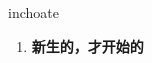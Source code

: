
\begin{frame}
{\huge inchoate}
\begin{center}
\begin{enumerate}\Large
  \item \textbf{新生的，才开始的}
\end{enumerate}
\end{center}
\end{frame}
